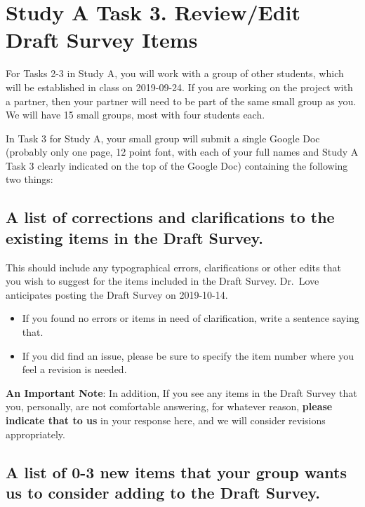 \documentclass[]{book}
\providecommand{\tightlist}{%
  \setlength{\itemsep}{0pt}\setlength{\parskip}{0pt}}
\begin{document}
\hypertarget{task3a}{%
\chapter{Study A Task 3. Review/Edit Draft Survey Items}\label{task3a}}

For Tasks 2-3 in Study A, you will work with a group of other students, which will be established in class on 2019-09-24. If you are working on the project with a partner, then your partner will need to be part of the same small group as you. We will have 15 small groups, most with four students each.

In Task 3 for Study A, your small group will submit a single Google Doc (probably only one page, 12 point font, with each of your full names and Study A Task 3 clearly indicated on the top of the Google Doc) containing the following two things:

\hypertarget{a-list-of-corrections-and-clarifications-to-the-existing-items-in-the-draft-survey.}{%
\section{A list of corrections and clarifications to the existing items in the Draft Survey.}\label{a-list-of-corrections-and-clarifications-to-the-existing-items-in-the-draft-survey.}}

This should include any typographical errors, clarifications or other edits that you wish to suggest for the items included in the Draft Survey. Dr.~Love anticipates posting the Draft Survey on 2019-10-14.

\begin{itemize}
\tightlist
\item
  If you found no errors or items in need of clarification, write a sentence saying that.
\item
  If you did find an issue, please be sure to specify the item number where you feel a revision is needed.
\end{itemize}

\textbf{An Important Note}: In addition, If you see any items in the Draft Survey that you, personally, are not comfortable answering, for whatever reason, \textbf{please indicate that to us} in your response here, and we will consider revisions appropriately.

\hypertarget{a-list-of-0-3-new-items-that-your-group-wants-us-to-consider-adding-to-the-draft-survey.}{%
\section{A list of 0-3 new items that your group wants us to consider adding to the Draft Survey.}\label{a-list-of-0-3-new-items-that-your-group-wants-us-to-consider-adding-to-the-draft-survey.}}
\end{document}
